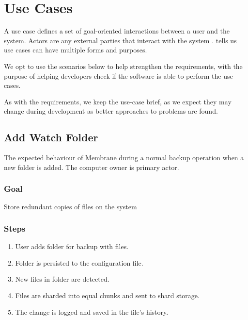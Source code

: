 \documentclass[11pt, a4paper, twocolumn, twoside]{report}
\begin{document}
\section{Use Cases}

A use case defines a set of goal-oriented interactions between a user and the system. Actors are any external parties that interact with the system \citep{malan2001functional}. \cite{cockburn1997structuring} tells us use cases can have multiple forms and purposes.

We opt to use the scenarios below to help strengthen the requirements, with the purpose of helping developers check if the software is able to perform the use cases.

As with the requirements, we keep the use-case brief, as we expect they may change during development as better approaches to problems are found.

\subsection{Add Watch Folder}
The expected behaviour of Membrane during a normal backup operation when a new folder is added. The computer owner is primary actor.

\subsubsection{Goal}

Store redundant copies of files on the system

\subsubsection{Steps}

\begin{enumerate}
 \item User adds folder for backup with files.
 \item Folder is persisted to the configuration file.
 \item New files in folder are detected.
 \item Files are sharded into equal chunks and sent to shard storage.
 \item The change is logged and saved in the file's history.
\end{enumerate}
\end{document}
